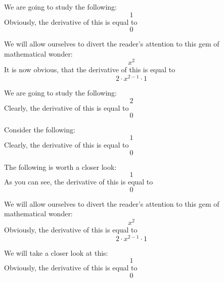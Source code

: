 \documentclass{article}
\begin{document}
We are going to study the following:
\begin{equation}
1 
\end{equation}
Obviously, the derivative of this is equal to
\begin{equation}
0 
\end{equation}

We will allow ourselves to divert the reader's attention to this gem of mathematical wonder:
\begin{equation}
x ^{2 } 
\end{equation}
It is now obvious, that the derivative of this is equal to
\begin{equation}
2 \cdot x ^{2 - 1 } \cdot 1 
\end{equation}

We are going to study the following:
\begin{equation}
2 
\end{equation}
Clearly, the derivative of this is equal to
\begin{equation}
0 
\end{equation}

Consider the following:
\begin{equation}
1 
\end{equation}
Clearly, the derivative of this is equal to
\begin{equation}
0 
\end{equation}

The following is worth a closer look:
\begin{equation}
1 
\end{equation}
As you can see, the derivative of this is equal to
\begin{equation}
0 
\end{equation}

We will allow ourselves to divert the reader's attention to this gem of mathematical wonder:
\begin{equation}
x ^{2 } 
\end{equation}
Obviously, the derivative of this is equal to
\begin{equation}
2 \cdot x ^{2 - 1 } \cdot 1 
\end{equation}

We will take a closer look at this:
\begin{equation}
1 
\end{equation}
Obviously, the derivative of this is equal to
\begin{equation}
0 
\end{equation}
\end{document}
